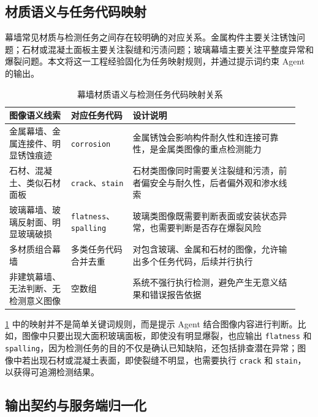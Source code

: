 \subsection{材质语义与任务代码映射}
\label{subsec:design-material-to-task-code-mapping}

幕墙常见材质与检测任务之间存在较明确的对应关系。金属构件主要关注锈蚀问题；石材或混凝土面板主要关注裂缝和污渍问题；玻璃幕墙主要关注平整度异常和爆裂问题。本文将这一工程经验固化为任务映射规则，并通过提示词约束 Agent 的输出。

\begin{table}[!htb]
  \caption{幕墙材质语义与检测任务代码映射关系}\label{tab:design-material-task-code-mapping}
  \centering
  \begin{tabular}{@{}p{0.2\linewidth}p{0.2\linewidth}p{0.54\linewidth}@{}} \toprule
    \textbf{图像语义线索} & \textbf{对应任务代码} & \textbf{设计说明} \\ \midrule
    金属幕墙、金属连接件、明显锈蚀痕迹 & \texttt{corrosion} & 金属锈蚀会影响构件耐久性和连接可靠性，是金属类图像的重点检测能力 \\
    石材、混凝土、类似石材面板 & \texttt{crack}、\texttt{stain} & 石材类图像同时需要关注裂缝和污渍，前者偏安全与耐久性，后者偏外观和渗水线索 \\
    玻璃幕墙、玻璃反射面、明显玻璃破损 & \texttt{flatness}、\texttt{spalling} & 玻璃类图像既需要判断表面或安装状态异常，也需要判断是否存在爆裂风险 \\
    多材质组合幕墙 & 多类任务代码合并去重 & 对包含玻璃、金属和石材的图像，允许输出多个任务代码，后续并行执行 \\
    非建筑幕墙、无法判断、无检测意义图像 & 空数组 & 系统不强行执行检测，避免产生无意义结果和错误报告依据 \\ \bottomrule
  \end{tabular}
\end{table}

\cref{tab:design-material-task-code-mapping} 中的映射并不是简单关键词规则，而是提示 Agent 结合图像内容进行判断。比如，图像中只要出现大面积玻璃面板，即使没有明显爆裂，也应输出 \texttt{flatness} 和 \texttt{spalling}，因为检测任务的目的不仅是确认已知缺陷，还包括排查潜在异常；图像中若出现石材或混凝土表面，即使裂缝不明显，也需要执行 \texttt{crack} 和 \texttt{stain}，以获得可追溯检测结果。

\subsection{输出契约与服务端归一化}
\label{subsec:design-classification-output-contract}

